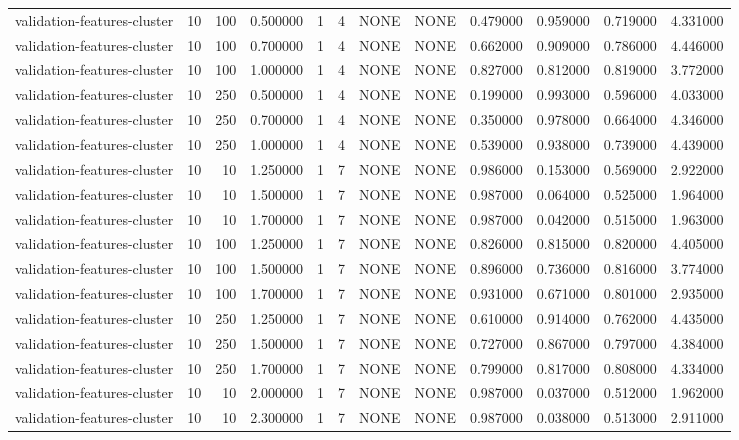 \begin{tabular}{lrrrllllrrrr}
validation-features-cluster & 10 & 100 & 0.500000 & 1 & 4 & NONE & NONE & 0.479000 & 0.959000 & 0.719000 & 4.331000 \\
validation-features-cluster & 10 & 100 & 0.700000 & 1 & 4 & NONE & NONE & 0.662000 & 0.909000 & 0.786000 & 4.446000 \\
validation-features-cluster & 10 & 100 & 1.000000 & 1 & 4 & NONE & NONE & 0.827000 & 0.812000 & 0.819000 & 3.772000 \\
validation-features-cluster & 10 & 250 & 0.500000 & 1 & 4 & NONE & NONE & 0.199000 & 0.993000 & 0.596000 & 4.033000 \\
validation-features-cluster & 10 & 250 & 0.700000 & 1 & 4 & NONE & NONE & 0.350000 & 0.978000 & 0.664000 & 4.346000 \\
validation-features-cluster & 10 & 250 & 1.000000 & 1 & 4 & NONE & NONE & 0.539000 & 0.938000 & 0.739000 & 4.439000 \\
validation-features-cluster & 10 & 10 & 1.250000 & 1 & 7 & NONE & NONE & 0.986000 & 0.153000 & 0.569000 & 2.922000 \\
validation-features-cluster & 10 & 10 & 1.500000 & 1 & 7 & NONE & NONE & 0.987000 & 0.064000 & 0.525000 & 1.964000 \\
validation-features-cluster & 10 & 10 & 1.700000 & 1 & 7 & NONE & NONE & 0.987000 & 0.042000 & 0.515000 & 1.963000 \\
validation-features-cluster & 10 & 100 & 1.250000 & 1 & 7 & NONE & NONE & 0.826000 & 0.815000 & 0.820000 & 4.405000 \\
validation-features-cluster & 10 & 100 & 1.500000 & 1 & 7 & NONE & NONE & 0.896000 & 0.736000 & 0.816000 & 3.774000 \\
validation-features-cluster & 10 & 100 & 1.700000 & 1 & 7 & NONE & NONE & 0.931000 & 0.671000 & 0.801000 & 2.935000 \\
validation-features-cluster & 10 & 250 & 1.250000 & 1 & 7 & NONE & NONE & 0.610000 & 0.914000 & 0.762000 & 4.435000 \\
validation-features-cluster & 10 & 250 & 1.500000 & 1 & 7 & NONE & NONE & 0.727000 & 0.867000 & 0.797000 & 4.384000 \\
validation-features-cluster & 10 & 250 & 1.700000 & 1 & 7 & NONE & NONE & 0.799000 & 0.817000 & 0.808000 & 4.334000 \\
validation-features-cluster & 10 & 10 & 2.000000 & 1 & 7 & NONE & NONE & 0.987000 & 0.037000 & 0.512000 & 1.962000 \\
validation-features-cluster & 10 & 10 & 2.300000 & 1 & 7 & NONE & NONE & 0.987000 & 0.038000 & 0.513000 & 2.911000 \\

\end{tabular}
